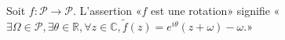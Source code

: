 Soit $f:\mathcal P\to \mathcal P$. L'assertion «$f$ est une rotation» signifie «$\exists \Omega\in\mathcal P, \exists \theta\in\mathbb R, \forall z\in\mathbb C, \tilde f(z)=e^{i\theta}(z+\omega)-\omega$.»

\begin{reponses}
\end{reponses}

